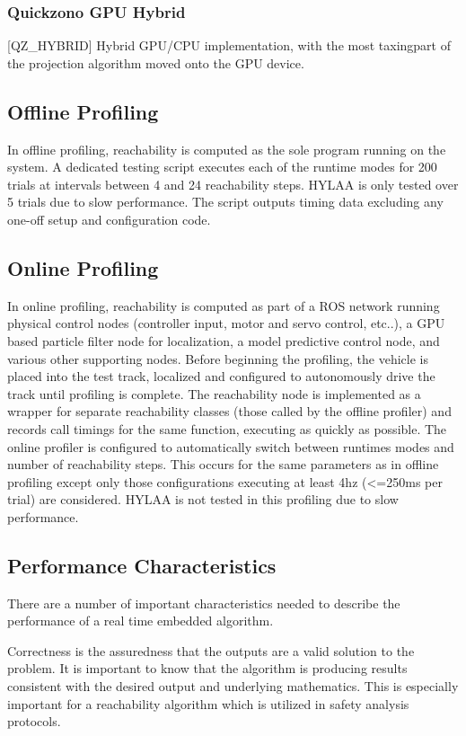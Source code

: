\documentclass[runningheads]{llncs}
\begin{document}
\subsubsection{Quickzono GPU Hybrid} [QZ\_HYBRID] \newline Hybrid GPU/CPU implementation, with the most taxing\newline part of the projection algorithm moved onto the GPU device. 
\vspace*{-5pt}

\subsection{Offline Profiling}
In offline profiling, reachability is computed as the sole program running on the system. A dedicated testing script executes each of the runtime modes for 200 trials at intervals between 4 and 24 reachability steps. HYLAA is only tested over 5 trials due to slow performance. The script outputs timing data excluding any one-off setup and configuration code.
\subsection{Online Profiling}
In online profiling, reachability is computed as part of a ROS network running physical control nodes (controller input, motor and servo control, etc..), a GPU based particle filter node for localization, a model predictive control node, and various other supporting nodes. Before beginning the profiling, the vehicle is placed into the test track, localized and configured to autonomously drive the track until profiling is complete. The reachability node is implemented as a wrapper for separate reachability classes (those called by the offline profiler) and records call timings for the same function, executing as quickly as possible. The online profiler is configured to automatically switch between runtimes modes and number of reachability steps. This occurs for the same parameters as in offline profiling except only those configurations executing at least 4hz (<=250ms per trial) are considered. HYLAA is not tested in this profiling due to slow performance.
\subsection{Performance Characteristics}
There are a number of important characteristics needed to describe the performance of a real time embedded algorithm.

Correctness is the assuredness that the outputs are a valid solution to the problem. It is important to know that the algorithm is producing results consistent with the desired output and underlying mathematics. This is especially important for a reachability algorithm which is utilized in safety analysis protocols.
\end{document}
